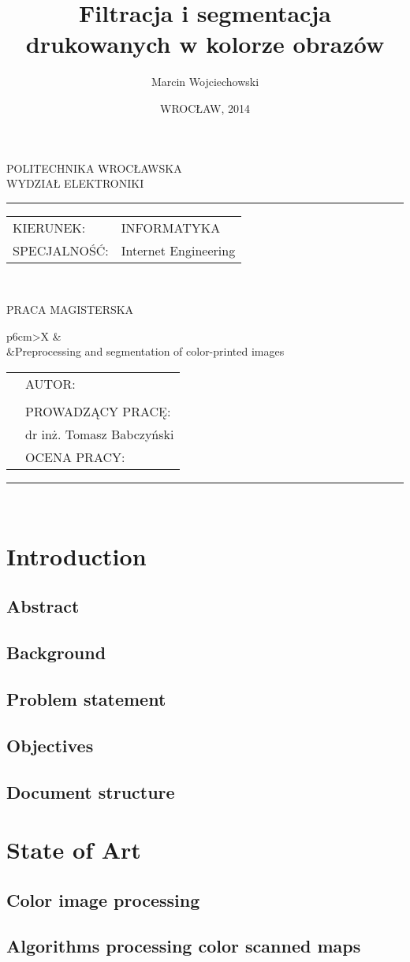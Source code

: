 \documentclass[a4paper,onecolumn,oneside,12pt]{memoir}
\makeatletter
\newcommand\uczelnia[1]{\renewcommand\@uczelnia{#1}}
\newcommand\@uczelnia{}
\newcommand\wydzial[1]{\renewcommand\@wydzial{#1}}
\newcommand\@wydzial{}
\newcommand\kierunek[1]{\renewcommand\@kierunek{#1}}
\newcommand\@kierunek{}
\newcommand\specjalnosc[1]{\renewcommand\@specjalnosc{#1}}
\newcommand\@specjalnosc{}
\newcommand\titleEN[1]{\renewcommand\@titleEN{#1}}
\newcommand\@titleEN{}
\newcommand\titleShort[1]{\renewcommand\@titleShort{#1}}
\newcommand\@titleShort{}
\newcommand\promotor[1]{\renewcommand\@promotor{#1}}
\newcommand\@promotor{}
\def\maketitle{%
  \null
  \pagestyle{empty}%
	{\centering\vspace{-1cm}
		{\fontsize{22pt}{24pt}\selectfont \@uczelnia}\\[0.4cm]
		{\fontsize{22pt}{24pt}\selectfont \@wydzial }\\[0.5cm]
		\hrule \vspace*{0.7cm}
	}
{\flushleft\fontsize{14pt}{16pt}\selectfont%
\begin{tabular}{ll}
KIERUNEK: & \@kierunek\\
SPECJALNOŚĆ: & \@specjalnosc\\
\end{tabular}\\[1.3cm]
}
{\centering
\vskip 1cm
{\fontsize{24pt}{26pt}\selectfont PRACA MAGISTERSKA}\\[2cm]
\vskip 0.8cm
}
%
\begin{tabularx}{\linewidth}{p{6cm}>{\centering\arraybackslash}X}
		&{\fontsize{16pt}{18pt}\selectfont \@title}\\[5mm] 	%
		&{\fontsize{16pt}{18pt}\selectfont \@titleEN}\\[10mm] %
\end{tabularx}
\vfill
\begin{tabularx}{\linewidth}{p{6cm}l}
		&{\fontsize{16pt}{18pt}\selectfont AUTOR:}\\[5mm]
		&{\fontsize{14pt}{16pt}\selectfont \@author}\\[10mm]
		&{\fontsize{16pt}{18pt}\selectfont PROWADZĄCY PRACĘ:}\\[5mm]
		&{\fontsize{14pt}{16pt}\selectfont \@promotor}\\[10mm]
		&{\fontsize{16pt}{18pt}\selectfont OCENA PRACY:}\\[20mm]
	\end{tabularx}
\hrule\vspace*{0.3cm}
{\centering
{\fontsize{16pt}{18pt}\selectfont \@date}\\[0cm]
}
\normalfont
 \cleardoublepage
}
\makeatother
\begin{document}
\title{Filtracja i segmentacja drukowanych w kolorze obrazów}
\titleShort{Filtracja i segmentacja drukowanych w kolorze obrazów}
\titleEN{Preprocessing and segmentation of color-printed images}
\author{Marcin Wojciechowski}
\uczelnia{POLITECHNIKA WROCŁAWSKA}
\wydzial{WYDZIAŁ ELEKTRONIKI}
\kierunek{INFORMATYKA}
\specjalnosc{Internet Engineering}
\promotor{dr inż. Tomasz Babczyński}
\date{WROCŁAW, 2014}
\maketitle

\pagestyle{outer}
\mbox{}
\tableofcontents* 
\newpage

\chapter{Introduction}

\section{Abstract}

\section{Background}

\section{Problem statement}

\section{Objectives}

\section{Document structure}


\chapter{State of Art}

\section{Color image processing}

\section{Algorithms processing color scanned maps}
\end{document}
